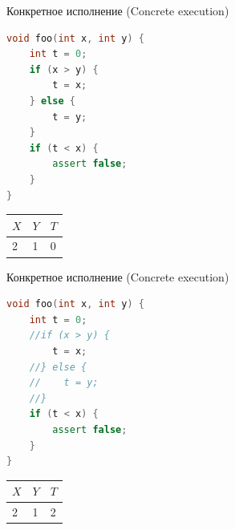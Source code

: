 \documentclass{beamer}
\begin{document}
\begin{frame}[fragile]{Конкретное исполнение (Concrete execution)}
\begin{minipage}{0.49\textwidth}
\begin{lstlisting}[language=C++]
void foo(int x, int y) {
    int t = 0;
    if (x > y) {
        t = x;
    } else {
        t = y;
    }
    if (t < x) {
        assert false;
    }
}
\end{lstlisting}
\end{minipage}
\hfill
\begin{minipage}{0.49\textwidth}
\begin{center}
\begin{tabular}{ | l | l | l | }
\hline
$X$ & $Y$ & $T$ \\
\hline
2 & 1 & 0 \\
\hline
\end{tabular}
\end{center}
\end{minipage}
\end{frame}

\begin{frame}[fragile]{Конкретное исполнение (Concrete execution)}
\begin{minipage}{0.49\textwidth}
\begin{lstlisting}[language=C++]
void foo(int x, int y) {
    int t = 0;
    //if (x > y) {
        t = x;
    //} else {
    //    t = y;
    //}
    if (t < x) {
        assert false;
    }
}
\end{lstlisting}
\end{minipage}
\hfill
\begin{minipage}{0.49\textwidth}
\begin{center}
\begin{tabular}{ | l | l | l | }
\hline
$X$ & $Y$ & $T$ \\
\hline
2 & 1 & 2 \\
\hline
\end{tabular}
\end{center}
\end{minipage}
\end{frame}
\end{document}
